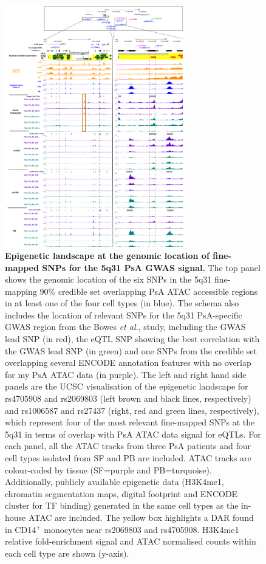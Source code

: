 \begin{figure}[htbp]
\centering
\includegraphics[width=0.7\textwidth]{./Results3/pdfs/UCSC_chr5q31_credible_set_all_cell_types_multipanel_final}
\caption[Epigenetic landscape at the genomic location of fine-mapped SNPs for the 5q31 PsA GWAS signal.]{\textbf{Epigenetic landscape at the genomic location of fine-mapped SNPs for the 5q31 PsA GWAS signal.} The top panel shows the genomic location of the six SNPs in the 5q31 fine-mapping 90\% credible set overlapping PsA ATAC accessible regions in at least one of the four cell types (in blue). The schema also includes the location of relevant SNPs for the 5q31 PsA-specific GWAS region from the Bowes \textit{et al.}, study, including the GWAS lead SNP (in red), the eQTL SNP showing the best correlation with the GWAS lead SNP (in green) and one SNPs from the credible set overlapping several ENCODE annotation features with no overlap for my PsA ATAC data (in purple). The left and right hand side panels are the UCSC visualisation of the epigenetic landscape for rs4705908 and rs2069803 (left brown and black lines, respectively) and rs1006587 and rs27437 (right, red and green lines, respectively), which represent four of the most relevant fine-mapped SNPs at the 5q31 in terms of overlap with PsA ATAC data signal for eQTLs. For each panel, all the ATAC tracks from three PsA patients and four cell types isolated from SF and PB are included. ATAC tracks are colour-coded by tissue (SF=purple and PB=turquoise). Additionally, publicly available epigenetic data (H3K4me1, chromatin segmentation maps, digital footprint and ENCODE cluster for TF binding) generated in the same cell types as the in-house ATAC are included. The yellow box highlights a DAR found in CD14$^+$ monocytes near rs2069803 and rs4705908. H3K4me1 relative fold-enrichment signal and ATAC normalised counts within each cell type are shown (y-axis).}
\label{figure:STAT2_fine_mapping_SNPs_epigenetic_track}
\end{figure}


